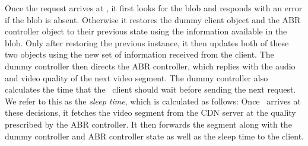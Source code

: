 \indent Once the request arrives at \servname, it first looks for the blob and responds with an error if the blob is absent. Otherwise it restores the dummy client object and the ABR controller object to their previous state using the information available in the blob. Only after restoring the previous instance, it then updates both of these two objects using the new set of information received from the client. The dummy controller then directs the \ac{ABR} controller, which replies with the audio and video quality of the next video segment.  The dummy controller also calculates the time that the \bel\ client should wait before sending the next request. We refer to this as the \textit{sleep time}, which is calculated as follows: Once \servname\ arrives at these decisions, it fetches the video segment from the \ac{CDN} server at the quality prescribed by the \ac{ABR} controller. It then forwards the segment along with the dummy controller and ABR controller state as well as the sleep time to the client.\\

